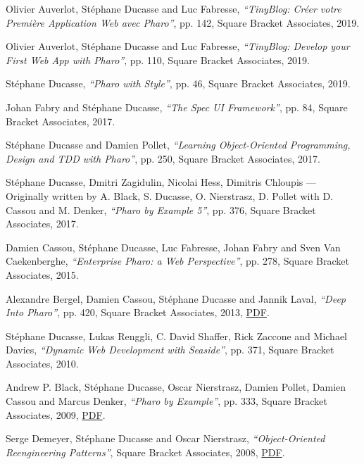 \documentclass{article}
\newcommand{\czauthors}[1]{#1}
\newcommand{\cztitle}[1]{\emph{``#1''}}
\begin{document}
\begin{itemize}

	\pub  \czauthors{Olivier Auverlot, St\'ephane Ducasse and Luc Fabresse},  \cztitle{TinyBlog: Cr\'eer votre Premi\`ere Application Web avec Pharo}, pp. 142, Square Bracket Associates, 2019.

	\pub  \czauthors{Olivier Auverlot, St\'ephane Ducasse and Luc Fabresse},  \cztitle{TinyBlog: Develop your First Web App with Pharo}, pp. 110, Square Bracket Associates, 2019.

	\pub  \czauthors{St\'ephane Ducasse},  \cztitle{Pharo with Style}, pp. 46, Square Bracket Associates, 2019.

	\pub  \czauthors{Johan Fabry and St\'ephane Ducasse},  \cztitle{The Spec UI Framework}, pp. 84, Square Bracket Associates, 2017.

	\pub  \czauthors{St\'ephane Ducasse and Damien Pollet},  \cztitle{Learning Object-Oriented Programming, Design and TDD with Pharo}, pp. 250, Square Bracket Associates, 2017.

	\pub  \czauthors{St\'ephane Ducasse, Dmitri Zagidulin, Nicolai Hess, Dimitris Chloupis --- Originally written by A. Black, S. Ducasse, O. Nierstrasz, D. Pollet with D. Cassou and M. Denker},  \cztitle{Pharo by Example 5}, pp. 376, Square Bracket Associates, 2017.

	\pub  \czauthors{Damien Cassou, St\'ephane Ducasse, Luc Fabresse, Johan Fabry and Sven Van Caekenberghe},  \cztitle{Enterprise Pharo: a Web Perspective}, pp. 278, Square Bracket Associates, 2015.

	\pub  \czauthors{Alexandre Bergel, Damien Cassou, St\'ephane Ducasse and Jannik Laval},  \cztitle{{Deep Into Pharo}}, pp. 420, Square Bracket Associates, 2013, \href{http://rmod-files.lille.inria.fr/Team/Books/Berg13a-PBE2-ESUG-2013-09-06.pdf}{PDF}.

	\pub  \czauthors{St\'ephane Ducasse, Lukas Renggli, C. David Shaffer, Rick Zaccone and Michael Davies},  \cztitle{Dynamic Web Development with Seaside}, pp. 371, Square Bracket Associates, 2010.

	\pub  \czauthors{Andrew P. Black, St\'ephane Ducasse, Oscar Nierstrasz, Damien Pollet, Damien Cassou and Marcus Denker},  \cztitle{Pharo by Example}, pp. 333, Square Bracket Associates, 2009, \href{http://rmod-files.lille.inria.fr/Team/Books/Blac09a-PBE1-2013-07-29.pdf}{PDF}.

	\pub  \czauthors{Serge Demeyer, St\'ephane Ducasse and Oscar Nierstrasz},  \cztitle{Object-Oriented Reengineering Patterns}, Square Bracket Associates, 2008, \href{http://rmod-files.lille.inria.fr/Team/Books/OORP.pdf}{PDF}.


\end{itemize}
\end{document}

